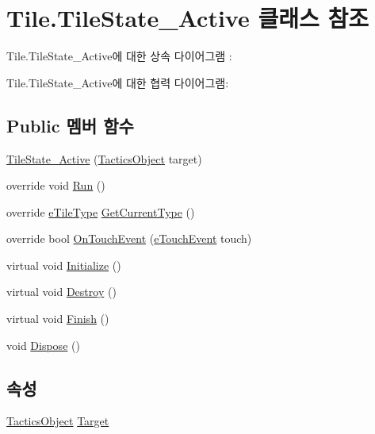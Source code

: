 \hypertarget{class_tile_1_1_tile_state___active}{}\section{Tile.\+Tile\+State\+\_\+\+Active 클래스 참조}
\label{class_tile_1_1_tile_state___active}


Tile.\+Tile\+State\+\_\+\+Active에 대한 상속 다이어그램 \+: 


Tile.\+Tile\+State\+\_\+\+Active에 대한 협력 다이어그램\+:
\subsection*{Public 멤버 함수}
\begin{DoxyCompactItemize}
\item 
\hyperlink{class_tile_1_1_tile_state___active_a8f5d4d3fe572b8cb2a97a333467662be}{Tile\+State\+\_\+\+Active} (\hyperlink{class_tactics_object}{Tactics\+Object} target)
\item 
override void \hyperlink{class_tile_1_1_tile_state___active_ab53c7c818d65122d6d36c9681ca53bf9}{Run} ()
\item 
override \hyperlink{_tile_8cs_a271bc07be325bca511bcb747e0ff2fda}{e\+Tile\+Type} \hyperlink{class_tile_1_1_tile_state___active_afdc52754ce22e231c691a52d213dd92d}{Get\+Current\+Type} ()
\item 
override bool \hyperlink{class_tile_1_1_tile_state___active_a7a9e2832931f69884ee0d9917ab619a8}{On\+Touch\+Event} (\hyperlink{_touch_manager_8cs_ae33e321a424fe84ba8b2fdb81ad40a68}{e\+Touch\+Event} touch)
\item 
virtual void \hyperlink{class_m_c_n_1_1_state_a5be59bc891e64cbbe4322d74a6746908}{Initialize} ()
\item 
virtual void \hyperlink{class_m_c_n_1_1_state_aebf48ef248bbf185d6aae91d9789459e}{Destroy} ()
\item 
virtual void \hyperlink{class_m_c_n_1_1_state_a2492ca731678b8216c02134dddeeb745}{Finish} ()
\item 
void \hyperlink{class_m_c_n_1_1_state_af6df0477e0dead784489688cb2c2093e}{Dispose} ()
\end{DoxyCompactItemize}
\subsection*{속성}
\begin{DoxyCompactItemize}
\item 
\hyperlink{class_tactics_object}{Tactics\+Object} \hyperlink{class_m_c_n_1_1_state_a79a563b32f183c9adc9a96679fc57eb8}{Target}
\end{DoxyCompactItemize}
